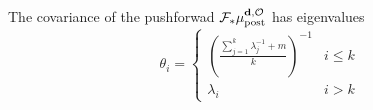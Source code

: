 \documentclass{beamer}
\begin{document}


\begin{frame}
  \begin{theorem}[D.]
    The covariance of the pushforwad \(\mathcal{F}_{*} \mu_{\textup{post}}^{\mathbf{d}, \mathcal{O}}\)
    has eigenvalues 
    \begin{equation*}
      \theta_i =
      \begin{cases}
        \left(\frac{\sum_{j=1}^k \lambda_j^{-1} + m}{k} \right )^{-1} & i \leq k \\
        \lambda_i &  i > k 
      \end{cases}
    \end{equation*}
  \end{theorem}
\end{frame}
\end{document}
